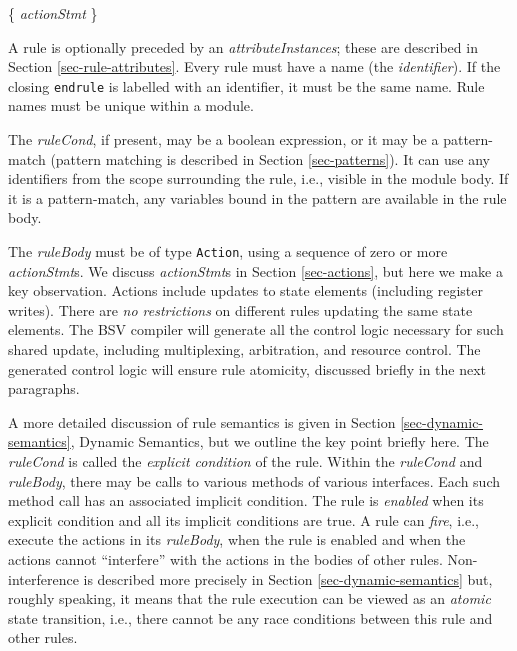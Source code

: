\documentclass[twoside,letterpaper]{article}
\newcommand{\hm}{\hspace*{1em}}
\newcommand{\BSV}{BSV}
\newcommand{\nterm}[1]{\emph{#1}}
\newcommand{\term}[1]{\texttt{#1}}
\newcommand{\many}[1]{\{ #1 \}}
\newcommand{\alt}{{$\mid$}}
\newcommand{\gram}[2]{    \hm\makebox[10em][l]{\it #1}\makebox[1.5em][l]{::=}    #2}
\newcommand{\gramalt}[1]{ \hm\makebox[10em][l]{      }\makebox[1.5em][l]{\alt}   #1}
\begin{document}
\gram{ruleBody}{ \many{ \nterm{actionStmt} } } 

A rule is optionally preceded by an \nterm{attributeInstances}; these are
described in Section \ref{sec-rule-attributes}.  Every rule must have
a name (the \nterm{identifier}).  If the closing \term{endrule} is
labelled with an identifier, it must be the same name.  Rule names
must be unique within a module.


The \nterm{ruleCond}, if present, may be a boolean expression, or it
may be a pattern-match (pattern matching is described in Section
{\ref{sec-patterns}}).  It can use any identifiers from the scope
surrounding the rule, i.e., visible in the module body.  If it is a
pattern-match, any variables bound in the pattern are available in the
rule body.

The \nterm{ruleBody} must be of type \texttt{Action}, using a sequence of
zero or more \nterm{actionStmt}s. %
 We
discuss \nterm{actionStmt}s in Section {\ref{sec-actions}}, but here
we make a key observation.  Actions include updates to state elements
(including register writes).  There are \emph{no restrictions} on
different rules updating the same state elements.  The {\BSV} compiler
will generate all the control logic necessary for such shared update,
including multiplexing, arbitration, and resource control.  The
generated control logic will ensure rule atomicity, discussed briefly
in the next paragraphs.

A more detailed discussion of rule semantics is given in Section
\ref{sec-dynamic-semantics}, Dynamic Semantics, but we outline the
key point briefly here.  The \nterm{ruleCond} is called the
\emph{explicit condition} of the rule.  Within the \nterm{ruleCond}
and \nterm{ruleBody}, there may be calls to various methods of various
interfaces.  Each such method call has an associated implicit
condition.  The rule is \emph{enabled} when its explicit condition and
all its implicit conditions are true.  A rule can \emph{fire}, i.e.,
execute the actions in its \nterm{ruleBody}, when the rule is enabled
and when the actions cannot ``interfere'' with the actions in the
bodies of other rules.  Non-interference is described more precisely
in Section \ref{sec-dynamic-semantics} but, roughly speaking, it means
that the rule execution can be viewed as an \emph{atomic} state
transition, i.e., there cannot be any race conditions between this
rule and other rules.
\end{document}
